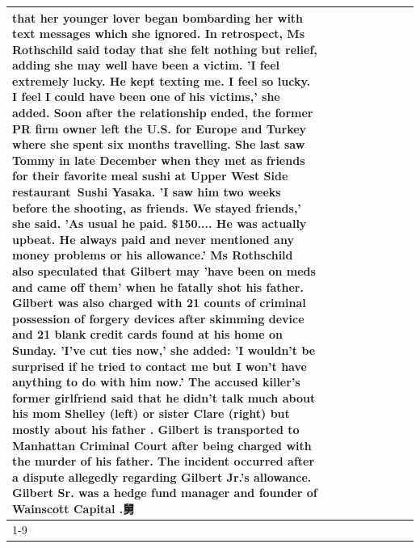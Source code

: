 \begin{table}[H]
\begin{tabular}{lllrlllll}
that her younger lover began bombarding her with text messages which she ignored. In retrospect, Ms Rothschild said today that she felt nothing but relief, adding she may well have been a victim. 'I feel extremely lucky. He kept texting me. I feel so lucky. I feel I could have been one of his victims,' she added. Soon after the relationship ended, the former PR firm owner left the U.S. for Europe and Turkey where she spent six months  travelling. She last saw Tommy in late December when they met as friends for their favorite meal sushi at Upper West Side restaurant Sushi Yasaka. 'I saw him two weeks before the shooting, as friends. We stayed friends,' she said. 'As usual he paid. \$150.... He was actually upbeat. He always paid and never mentioned any money problems or his allowance.' Ms Rothschild also speculated that Gilbert may 'have been on meds and came off them' when he fatally shot his father. Gilbert was also charged with 21 counts of criminal possession of forgery devices after skimming device and 21 blank credit cards found at his home on Sunday. 'I've cut ties now,' she added: 'I wouldn’t be surprised if he tried to contact me but I won’t have anything to do with him now.' The accused killer's former girlfriend said that he didn't talk much about his mom Shelley (left) or sister Clare (right) but mostly about his father . Gilbert is transported to Manhattan Criminal Court  after being charged with the murder of his father. The incident occurred after a dispute allegedly regarding Gilbert Jr.'s allowance. Gilbert Sr. was a hedge fund manager and founder of Wainscott Capital .舅 \\
\cline{1-9}

\end{tabular}
\end{table}
